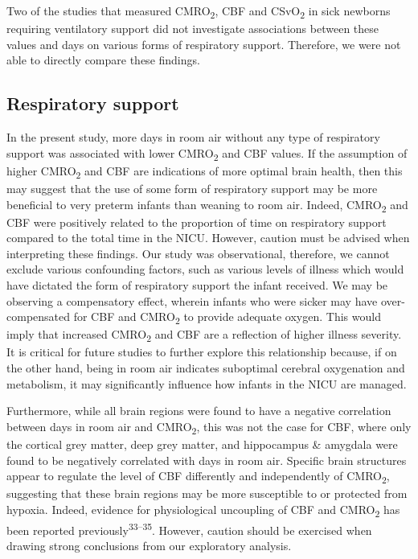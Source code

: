 \documentclass[
  letterpaper,
  DIV=11,
  numbers=noendperiod]{scrartcl}
\begin{document}
Two of the studies that measured CMRO\textsubscript{2}, CBF and
CSvO\textsubscript{2} in sick newborns requiring ventilatory support did
not investigate associations between these values and days on various
forms of respiratory support. Therefore, we were not able to directly
compare these findings.

\subsection{Respiratory support}\label{respiratory-support}

In the present study, more days in room air without any type of
respiratory support was associated with lower CMRO\textsubscript{2} and
CBF values. If the assumption of higher CMRO\textsubscript{2} and CBF
are indications of more optimal brain health, then this may suggest that
the use of some form of respiratory support may be more beneficial to
very preterm infants than weaning to room air. Indeed,
CMRO\textsubscript{2} and CBF were positively related to the proportion
of time on respiratory support compared to the total time in the NICU.
However, caution must be advised when interpreting these findings. Our
study was observational, therefore, we cannot exclude various
confounding factors, such as various levels of illness which would have
dictated the form of respiratory support the infant received. We may be
observing a compensatory effect, wherein infants who were sicker may
have over-compensated for CBF and CMRO\textsubscript{2} to provide
adequate oxygen. This would imply that increased CMRO\textsubscript{2}
and CBF are a reflection of higher illness severity. It is critical for
future studies to further explore this relationship because, if on the
other hand, being in room air indicates suboptimal cerebral oxygenation
and metabolism, it may significantly influence how infants in the NICU
are managed.

Furthermore, while all brain regions were found to have a negative
correlation between days in room air and CMRO\textsubscript{2}, this was
not the case for CBF, where only the cortical grey matter, deep grey
matter, and hippocampus \& amygdala were found to be negatively
correlated with days in room air. Specific brain structures appear to
regulate the level of CBF differently and independently of
CMRO\textsubscript{2}, suggesting that these brain regions may be more
susceptible to or protected from hypoxia. Indeed, evidence for
physiological uncoupling of CBF and CMRO\textsubscript{2} has been
reported previously\textsuperscript{33--35}. However, caution should be
exercised when drawing strong conclusions from our exploratory analysis.
\end{document}
